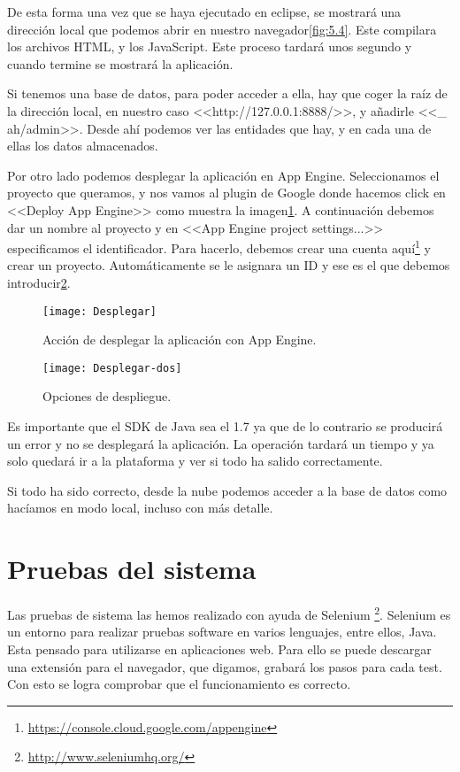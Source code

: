 De esta forma una vez que se haya ejecutado en eclipse, se mostrará una dirección local que podemos abrir en nuestro navegador\ref{fig:5.4}. Este compilara los archivos HTML, y los JavaScript. Este proceso tardará unos segundo y cuando termine se mostrará la aplicación.

Si tenemos una base de datos, para poder acceder a ella, hay que coger la raíz de la dirección local, en nuestro caso <<http://127.0.0.1:8888/>>, y añadirle <<\_ ah/admin>>. Desde ahí podemos ver las entidades que hay, y en cada una de ellas los datos almacenados.


Por otro lado podemos desplegar la aplicación en App Engine. Seleccionamos el proyecto que queramos, y nos vamos al plugin de Google donde hacemos click en <<Deploy App Engine>> como muestra la imagen\ref{fig:5.5}. A continuación debemos dar un nombre al proyecto y en <<App Engine project settings...>> especificamos el identificador. Para hacerlo, debemos crear una cuenta aquí\footnote{\url{https://console.cloud.google.com/appengine}} y crear un proyecto. Automáticamente se le asignara un ID y ese es el que debemos introducir\ref{fig:5.6}. 
\begin{figure}
\centering
\texttt{[image: Desplegar]}
\caption{Acción de desplegar la aplicación con App Engine.}
\label{fig:5.5}
\end{figure}

\begin{figure}
\centering
\texttt{[image: Desplegar-dos]}
\caption{Opciones de despliegue.}
\label{fig:5.6}
\end{figure}

Es importante que el SDK de Java sea el 1.7 ya que de lo contrario se producirá un error y no se desplegará la aplicación. La operación tardará un tiempo y ya solo quedará ir a la plataforma y ver si todo ha salido correctamente.

Si todo ha sido correcto, desde la nube podemos acceder a la base de datos como hacíamos en modo local, incluso con más detalle.

\section{Pruebas del sistema}


Las pruebas de sistema las hemos realizado con ayuda de Selenium \footnote{\url{http://www.seleniumhq.org/}}. Selenium es un entorno para realizar pruebas software en varios lenguajes, entre ellos, Java. Esta pensado para utilizarse en aplicaciones web. Para ello se puede descargar una extensión para el navegador, que digamos, grabará los pasos para cada test. Con esto se logra comprobar que el funcionamiento es correcto.

